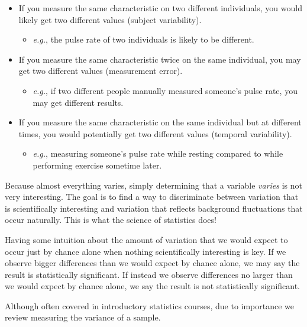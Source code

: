 \documentclass[
]{book}
\providecommand{\tightlist}{%
  \setlength{\itemsep}{0pt}\setlength{\parskip}{0pt}}
\begin{document}
\begin{itemize}
\tightlist
\item
  If you measure the same characteristic on two different individuals, you would likely get two different values (subject variability).

  \begin{itemize}
  \tightlist
  \item
    \emph{e.g.}, the pulse rate of two individuals is likely to be different.
  \end{itemize}
\item
  If you measure the same characteristic twice on the same individual, you may get two different values (measurement error).

  \begin{itemize}
  \tightlist
  \item
    \emph{e.g.}, if two different people manually measured someone's pulse rate, you may get different results.
  \end{itemize}
\item
  If you measure the same characteristic on the same individual but at different times, you would potentially get two different values (temporal variability).

  \begin{itemize}
  \tightlist
  \item
    \emph{e.g.}, measuring someone's pulse rate while resting compared to while performing exercise sometime later.
  \end{itemize}
\end{itemize}

Because almost everything varies, simply determining that a variable \emph{varies} is not very interesting.
The goal is to find a way to discriminate between variation that is scientifically interesting and variation that reflects background fluctuations that occur naturally.
This is what the science of statistics does!

Having some intuition about the amount of variation that we would expect to occur just by chance alone when nothing scientifically interesting is key.
If we observe bigger differences than we would expect by chance alone, we may say the result is statistically significant.
If instead we observe differences no larger than we would expect by chance alone, we say the result is not statistically significant.

Although often covered in introductory statistics courses, due to importance we review measuring the variance of a sample.
\end{document}
